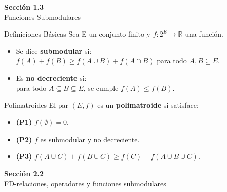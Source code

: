 \documentclass{beamer}
\begin{document}
  \begin{frame}
    \begin{center}
      \Huge \textbf{Sección 1.3}\\
      \vspace{0.5cm}
      \Large Funciones Submodulares
    \end{center}
  \end{frame}

  \begin{frame}{Definiciones Básicas}
    Sea E un conjunto finito y $f:2^{E}\rightarrow\mathbb{R}$ una función.
    
    \vspace{0.5cm}
    \begin{itemize}[<+->]
      \item Se dice \textbf{submodular} si: \\
            $f(A)+f(B)\ge f(A\cup B)+f(A\cap B)$ para todo $A, B\subseteq E$.
      \item Es \textbf{no decreciente} si: \\
            para todo $A\subseteq B\subseteq E$, se cumple $f(A)\le f(B)$.
    \end{itemize}
  \end{frame}

  \begin{frame}{Polimatroides}
    El par $(E, f)$ es un \textbf{polimatroide} si satisface:
    
    \vspace{0.5cm}
    \begin{itemize}[<+->]
      \item \textbf{(P1)} $f(\emptyset)=0$.
      \item \textbf{(P2)} $f$ es submodular y no decreciente.
      \item \textbf{(P3)} $f(A\cup C)+f(B\cup C)\ge f(C)+f(A\cup B\cup C)$.
    \end{itemize}
  \end{frame}

  \begin{frame}
    \begin{center}
      \Huge \textbf{Sección 2.2}\\
      \vspace{0.5cm}
      \Large FD-relaciones, operadores y funciones submodulares
    \end{center}
  \end{frame}
\end{document}
